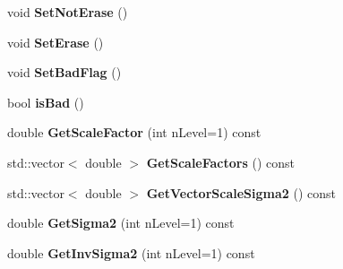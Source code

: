 \begin{DoxyCompactItemize}
\item 
void {\bfseries Set\+Not\+Erase} ()\hypertarget{classMultiColSLAM_1_1cMultiKeyFrame_a4348959bf4a1bb794a3551125330e211}{}\label{classMultiColSLAM_1_1cMultiKeyFrame_a4348959bf4a1bb794a3551125330e211}

\item 
void {\bfseries Set\+Erase} ()\hypertarget{classMultiColSLAM_1_1cMultiKeyFrame_a6fb5d261ec99a0017d318888415aa014}{}\label{classMultiColSLAM_1_1cMultiKeyFrame_a6fb5d261ec99a0017d318888415aa014}

\item 
void {\bfseries Set\+Bad\+Flag} ()\hypertarget{classMultiColSLAM_1_1cMultiKeyFrame_a98eacb6660fdf85f823949bb32afd4b1}{}\label{classMultiColSLAM_1_1cMultiKeyFrame_a98eacb6660fdf85f823949bb32afd4b1}

\item 
bool {\bfseries is\+Bad} ()\hypertarget{classMultiColSLAM_1_1cMultiKeyFrame_abd7ab99844525e3b3502ab581dd1d033}{}\label{classMultiColSLAM_1_1cMultiKeyFrame_abd7ab99844525e3b3502ab581dd1d033}

\item 
double {\bfseries Get\+Scale\+Factor} (int n\+Level=1) const \hypertarget{classMultiColSLAM_1_1cMultiKeyFrame_ae4e32f41b5ef387ad62436a0e6ca23aa}{}\label{classMultiColSLAM_1_1cMultiKeyFrame_ae4e32f41b5ef387ad62436a0e6ca23aa}

\item 
std\+::vector$<$ double $>$ {\bfseries Get\+Scale\+Factors} () const \hypertarget{classMultiColSLAM_1_1cMultiKeyFrame_a0bfe04017b3cbc3e3e5c7447ffad158e}{}\label{classMultiColSLAM_1_1cMultiKeyFrame_a0bfe04017b3cbc3e3e5c7447ffad158e}

\item 
std\+::vector$<$ double $>$ {\bfseries Get\+Vector\+Scale\+Sigma2} () const \hypertarget{classMultiColSLAM_1_1cMultiKeyFrame_a50f155af48e2ca6aeaccde0ddfdf9896}{}\label{classMultiColSLAM_1_1cMultiKeyFrame_a50f155af48e2ca6aeaccde0ddfdf9896}

\item 
double {\bfseries Get\+Sigma2} (int n\+Level=1) const \hypertarget{classMultiColSLAM_1_1cMultiKeyFrame_afec4720f66e436149e239f8c9551a6cc}{}\label{classMultiColSLAM_1_1cMultiKeyFrame_afec4720f66e436149e239f8c9551a6cc}

\item 
double {\bfseries Get\+Inv\+Sigma2} (int n\+Level=1) const \hypertarget{classMultiColSLAM_1_1cMultiKeyFrame_a1f54a19c6af5349b16b781bf5eb0a2ef}{}\label{classMultiColSLAM_1_1cMultiKeyFrame_a1f54a19c6af5349b16b781bf5eb0a2ef}


\end{DoxyCompactItemize}
